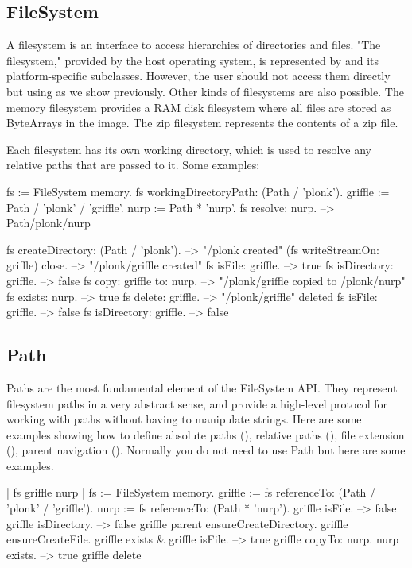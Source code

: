 \documentclass[a4paper,10pt,twoside]{book}
\begin{document}
\subsection{FileSystem}
A filesystem is an interface to access hierarchies of directories and files. "The filesystem," provided by the host operating system, is represented by  and its platform-specific subclasses. However, the user should not access them directly but using  as we show previously. Other kinds of filesystems are also possible. The memory filesystem provides a RAM disk filesystem where all files are stored as ByteArrays in the image. The zip filesystem represents the contents of a zip file.

Each filesystem has its own working directory, which is used to resolve any relative paths that are passed to it. Some examples:

\begin{code}{}
fs := FileSystem memory.
fs workingDirectoryPath: (Path / 'plonk').
griffle := Path / 'plonk' / 'griffle'.
nurp := Path * 'nurp'.
fs resolve: nurp.            
	--> Path/plonk/nurp
    
fs createDirectory: (Path / 'plonk').  --> "/plonk created"
(fs writeStreamOn: griffle) close.  --> "/plonk/griffle created"
fs isFile: griffle.         --> true
fs isDirectory: griffle.         --> false
fs copy: griffle to: nurp.       --> "/plonk/griffle copied to /plonk/nurp"
fs exists: nurp.             --> true
fs delete: griffle.          --> "/plonk/griffle" deleted
fs isFile: griffle.          --> false
fs isDirectory: griffle.         --> false
\end{code}
	

\subsection{Path}
Paths are the most fundamental element of the FileSystem API. They represent filesystem paths in a very abstract sense, and provide a high-level protocol for working with paths without having to manipulate strings. Here are some examples showing how to define absolute paths (), relative paths (), file extension (), parent navigation ().
Normally you do not need to use Path but here are some examples.

\begin{code}{}
| fs griffle nurp | 
fs := FileSystem memory.
griffle := fs referenceTo: (Path / 'plonk' / 'griffle').
nurp := fs referenceTo: (Path * 'nurp').
griffle isFile.	
    --> false			
griffle isDirectory. 		
    --> false		
griffle parent ensureCreateDirectory.
griffle ensureCreateFile.
griffle exists & griffle isFile.		
    --> true
griffle copyTo: nurp.
nurp exists.			
    --> true	
griffle delete       
\end{code}    
\end{document}
